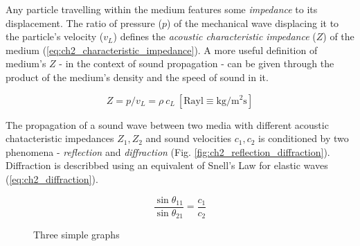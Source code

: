 Any particle travelling within the medium features some \textit{impedance} 
to its displacement. The ratio of pressure ($p$) of the mechanical wave displacing it to the 
particle's velocity ($v_L$) defines the \textit{acoustic characteristic impedance} ($Z$) of 
the medium (\ref{eq:ch2_characteristic_impedance}). 
A more useful definition of medium's $Z$ - in the context of sound propagation - can be 
given through the product of the medium's 
density and the speed of sound in it.

\begin{equation}
  Z = p/v_L = \rho \ c_L \ \mathrm{[Rayl \equiv kg/m^2s]}
  \label{eq:ch2_characteristic_impedance}
\end{equation}

The propagation of a sound wave between two media with different acoustic chatacteristic 
impedances $Z_1,Z_2$ and sound velocities $c_1, c_2$ is conditioned by two phenomena - \emph{reflection} and \emph{diffraction} (Fig. \ref{fig:ch2_reflection_diffraction}). 
Diffraction is describbed using an equivalent of 
Snell's Law for elastic waves (\ref{eq:ch2_diffraction}). 

\begin{equation}
  \frac{\sin{\theta_{11}}}{\sin{\theta_{21}}} = \frac{c_1}{c_2}
  \label{eq:ch2_diffraction}
\end{equation}

\begin{figure}[h]
\centering
\begin{varwidth}{1.0\linewidth}
\end{varwidth}
\caption{Three simple graphs}
\label{fig:ch2_elastic_waves}
\end{figure}

